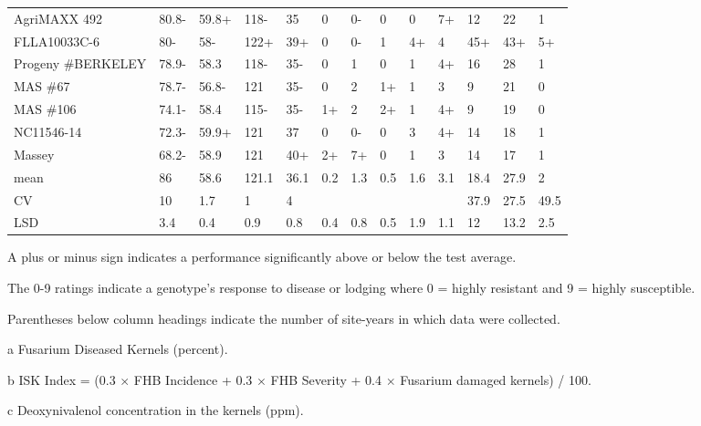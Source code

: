 \documentclass[12pt, letterpaper]{article}
\begin{document}
\begin{landscape}
\begin{ThreePartTable}
\begin{longtable}{lllllllllllll}
  AgriMAXX 492 & 80.8- & 59.8+ & 118- & 35 & 0 & 0- & 0 & 0 & 7+ & 12 & 22 & 1 \\ 
  FLLA10033C-6 & 80- & 58- & 122+ & 39+ & 0 & 0- & 1 & 4+ & 4 & 45+ & 43+ & 5+ \\ 
  Progeny \#BERKELEY & 78.9- & 58.3 & 118- & 35- & 0 & 1 & 0 & 1 & 4+ & 16 & 28 & 1 \\ 
  MAS \#67 & 78.7- & 56.8- & 121 & 35- & 0 & 2 & 1+ & 1 & 3 & 9 & 21 & 0 \\ 
  MAS \#106 & 74.1- & 58.4 & 115- & 35- & 1+ & 2 & 2+ & 1 & 4+ & 9 & 19 & 0 \\ 
  NC11546-14 & 72.3- & 59.9+ & 121 & 37 & 0 & 0- & 0 & 3 & 4+ & 14 & 18 & 1 \\ 
  Massey & 68.2- & 58.9 & 121 & 40+ & 2+ & 7+ & 0 & 1 & 3 & 14 & 17 & 1 \\ 
  mean & 86 & 58.6 & 121.1 & 36.1 & 0.2 & 1.3 & 0.5 & 1.6 & 3.1 & 18.4 & 27.9 & 2 \\ 
  CV & 10 & 1.7 & 1 & 4 &  &  &  &  &  & 37.9 & 27.5 & 49.5 \\ 
  LSD & 3.4 & 0.4 & 0.9 & 0.8 & 0.4 & 0.8 & 0.5 & 1.9 & 1.1 & 12 & 13.2 & 2.5 \\ 
\end{longtable}
\end{ThreePartTable}

\newpage


\begin{ThreePartTable}
\begin{TableNotes}
\footnotesize
\item A plus or minus sign indicates a performance significantly above or below the test average.
\item The 0-9 ratings indicate a genotype's response to disease or lodging where 0 = highly resistant and 9 = highly susceptible.
\item Parentheses below column headings indicate the number of site-years in which data were collected.
\item [a] Fusarium Diseased Kernels (percent).
\item [b] ISK Index = (0.3 $\times$ FHB Incidence + 0.3 $\times$ FHB Severity + 0.4 $\times$ Fusarium damaged kernels) / 100.
\item [c] Deoxynivalenol concentration in the kernels (ppm).
\end{TableNotes}


\end{ThreePartTable}
\end{landscape}
\end{document}
